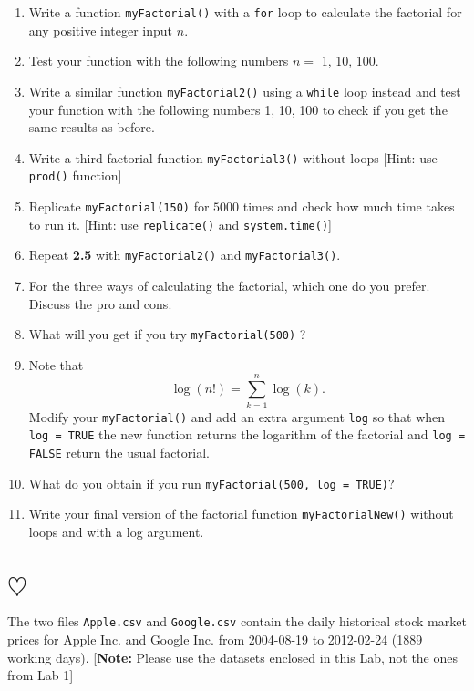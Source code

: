 \documentclass[a4paper]{article}
\begin{document}
\begin{enumerate}
\item Write a function \texttt{myFactorial()} with a \texttt{for} loop to
  calculate the factorial for any positive integer input $n$.
\item Test your function with the following numbers $n=$ 1, 10, 100.
\item Write a similar function \texttt{myFactorial2()} using a \texttt{while} loop
  instead and test your function with the following numbers 1, 10, 100 to check
  if you get the same results as before.
\item Write a third factorial function \texttt{myFactorial3()} without loops
  [Hint: use \texttt{prod()} function]
\item Replicate \texttt{myFactorial(150)} for $5000$ times and check how much
  time takes to run it. [Hint: use \texttt{replicate()} and \texttt{system.time()}] 
     
\item Repeat \textbf{2.5} with \texttt{myFactorial2()} and
  \texttt{myFactorial3()}.
\item For the three ways of calculating the factorial, which one do you
  prefer. Discuss the pro and cons. 
\item What will you get if you try \texttt{myFactorial(500)} ?
\item Note that 
\begin{equation*}
  \label{eq:1}
    \log(n!)=\sum_{k=1}^n \log(k) \!.   
\end{equation*}
Modify your \texttt{myFactorial()} and add an extra argument \texttt{log} so that
when \texttt{log = TRUE} the new function returns the logarithm of the factorial and \texttt{log =
  FALSE} return the usual factorial.
\item What do you obtain if you run \texttt{myFactorial(500, log = TRUE)}?
\item Write your final version of the factorial function \texttt{myFactorialNew()}
  without loops and with a log argument.
\end{enumerate}

\section{$\heartsuit$}
The two files \texttt{Apple.csv} and \texttt{Google.csv} contain the daily
historical stock market prices for Apple Inc. and Google Inc. from 2004-08-19
to 2012-02-24 (1889 working days). [\textbf{Note:} Please use the datasets
enclosed in this Lab, not the ones from Lab 1]
\end{document}
